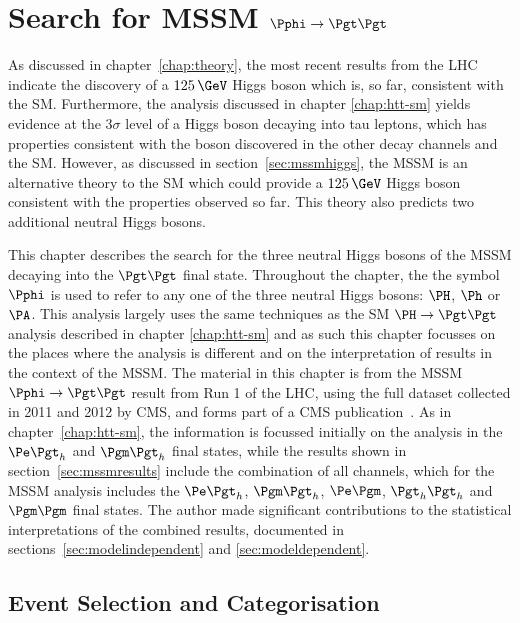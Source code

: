 \chapter{Search for MSSM $\Pphi\to\Pgt\Pgt$}
\label{chap:htt-mssm}

As discussed in chapter~\ref{chap:theory}, the most recent results from the
\ac{LHC} indicate the discovery of a $125\,\GeV$ Higgs boson which is, so far, consistent with the
\ac{SM}. Furthermore, the analysis discussed in chapter \ref{chap:htt-sm} yields 
evidence at the $3\sigma$ level of a Higgs boson decaying into tau leptons, which has 
properties consistent with the boson  discovered in the other decay channels and the \ac{SM}.
However, as discussed in section~\ref{sec:mssmhiggs}, the \ac{MSSM} is an
alternative theory to the \ac{SM} which could provide a $125\,\GeV$ Higgs boson
consistent with the properties observed so far. This theory also
predicts two additional neutral Higgs bosons.

This chapter describes
the search for the three neutral Higgs bosons of the \ac{MSSM} decaying into the
$\Pgt\Pgt$ final state. Throughout the chapter, the the symbol $\Pphi$ is used to refer to any one of the three
neutral Higgs bosons: $\PH$, $\Ph$ or $\PA$. This analysis largely uses the same
techniques as the \ac{SM} $\HToTauTau$ analysis described in chapter
\ref{chap:htt-sm} and as such this chapter focusses on the
places where the analysis is different and on the interpretation of results in
the context of the \ac{MSSM}. The material in this chapter is from the
\ac{MSSM} $\Pphi\to\Pgt\Pgt$ result from Run 1 of the \ac{LHC}, using the full
dataset collected in 2011 and 2012 by CMS, and forms part of a CMS publication~\cite{HIG-13-021}. 
As in chapter~\ref{chap:htt-sm}, the information is focussed
initially on the analysis in the $\etau$ and $\mutau$ final states, while 
the results shown in section~\ref{sec:mssmresults} include the combination of 
all channels, which for the \ac{MSSM} analysis includes the $\etau$, $\mutau$, $\emu$, $\tautau$ and
$\mumu$ final states. The author made significant contributions to 
the statistical interpretations of the combined results, documented in 
sections~\ref{sec:modelindependent} and \ref{sec:modeldependent}. 

\section{Event Selection and Categorisation}
\label{sec:mssmEventSelection}

